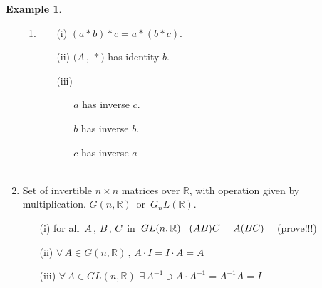 \documentclass[11pt,a4paper]{article}
\theoremstyle{definition}
\newtheorem{exa}[thm]{Example}
\begin{document}
\begin{exa}
\begin{enumerate}
\begin{enumerate}
    \item \begin{enumerate}
          \item[(i)] $(a*b)*c = a*(b*c)$.
          \item[(ii)] $\big(A\, , \, *\big)$ has identity $b$.
          \item[(iii)]\begin{enumerate}
                        \item[]$a$ has inverse $c$.
                        \item[] $b$ has inverse $b$.
                        \item[] $c$ has inverse $a$\\\\
          \end{enumerate}
    \end{enumerate}
\end{enumerate}


\item Set of invertible $n\times n$ matrices over $\mathbb{R}$, with operation given by multiplication. $G(n,\mathbb{R})\,$ or $\, G_nL({\mathbb{R}})$.
\begin{enumerate}
       \item[(i)] for all $\,A\, , \, B\,, \, C\,$ in $\, GL(n,\mathbb{R})\hspace{0.3cm} (AB)C = A(BC)\hspace{0.3cm}$ (prove!!!)
       \item[(ii)] $\forall\, A\in G(n,\mathbb{R})\, , \, A\cdot I = I\cdot A = A$
       \item[(iii)] $\forall\, A\in GL(n,\mathbb{R})\,\, \exists\, A^{-1}\ni A\cdot A^{-1} = A^{-1}A = I$
\end{enumerate}


\end{enumerate}
\end{exa}
\end{document}
